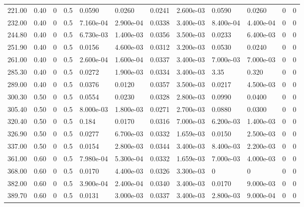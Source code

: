 \documentclass[preview]{standalone}
\begin{document}
{{\begin{tabular}{L{1.2cm}C{1.2cm} C{0.3cm}C{0.5cm} C{1.4cm}C{1.4cm} C{1.4cm}C{1.4cm} C{1.6cm}C{1.6cm} C{1.6cm}C{1.6cm}}
  221.00  &  0.40  & 0     & 0.5 &  0.0590  & 0.0260  &  0.0241&   2.600e-03& 0.0590 & 0.0260   &  0 & 0  \\ 
  232.00  &  0.40  & 0     & 0.5 &  7.160e-04  & 2.900e-04  &  0.0338&   3.400e-03& 8.400e-04 & 4.400e-04   &  0 & 0  \\ 
  244.80  &  0.40  & 0     & 0.5 &  6.730e-03  & 1.400e-03  &  0.0356&   3.500e-03& 0.0233 & 6.400e-03   &  0 & 0  \\ 
  251.90  &  0.40  & 0     & 0.5 &  0.0156  & 4.600e-03  &  0.0312&   3.200e-03& 0.0530 & 0.0240   &  0 & 0  \\ 
  261.00  &  0.40  & 0     & 0.5 &  2.600e-04  & 1.600e-04  &  0.0337&   3.400e-03& 7.000e-03 & 7.000e-03   &  0 & 0  \\ 
  285.30  &  0.40  & 0     & 0.5 &  0.0272  & 1.900e-03  &  0.0334&   3.400e-03& 3.35 & 0.320   &  0 & 0  \\ 
  289.00  &  0.40  & 0     & 0.5 &  0.0376  & 0.0120  &  0.0357&   3.500e-03& 0.0217 & 4.500e-03   &  0 & 0  \\ 
  300.30  &  0.50  & 0     & 0.5 &  0.0554  & 0.0230  &  0.0328&   2.800e-03& 0.0990 & 0.0400   &  0 & 0  \\ 
  305.40  &  0.50  & 0     & 0.5 &  8.000e-03  & 1.800e-03  &  0.0271&   2.700e-03& 0.0880 & 0.0300   &  0 & 0  \\ 
  320.40  &  0.50  & 0     & 0.5 &  0.184  & 0.0170  &  0.0316&   7.000e-03& 6.200e-03 & 1.400e-03   &  0 & 0  \\ 
  326.90  &  0.50  & 0     & 0.5 &  0.0277  & 6.700e-03  &  0.0332&   1.659e-03& 0.0150 & 2.500e-03   &  0 & 0  \\ 
  337.00  &  0.50  & 0     & 0.5 &  0.0154  & 2.800e-03  &  0.0344&   3.400e-03& 8.400e-03 & 2.200e-03   &  0 & 0  \\ 
  361.00  &  0.60  & 0     & 0.5 &  7.980e-04  & 5.300e-04  &  0.0332&   1.659e-03& 7.000e-03 & 4.000e-03   &  0 & 0  \\ 
  368.00  &  0.60  & 0     & 0.5 &  0.0170  & 4.400e-03  &  0.0326&   3.300e-03& 0 & 0   &  0 & 0  \\ 
  382.00  &  0.60  & 0     & 0.5 &  3.900e-04  & 2.400e-04  &  0.0340&   3.400e-03& 0.0170 & 9.000e-03   &  0 & 0  \\ 
  389.70  &  0.60  & 0     & 0.5 &  0.0131  & 3.000e-03  &  0.0337&   3.400e-03& 2.800e-03 & 9.000e-04   &  0 & 0  \\ 
\hline 
\end{tabular} 

}}
\end{document}
